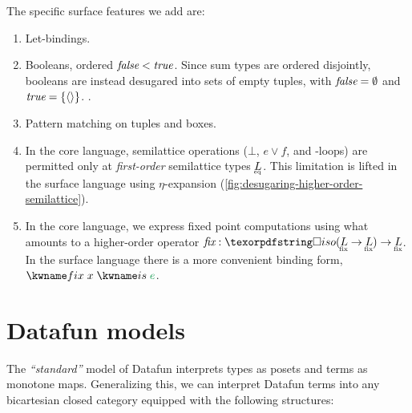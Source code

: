 \documentclass{rntz}\usepackage{fantasy}%
\begin{document}
The specific surface features we add are:
\begin{enumerate}
\item Let-bindings.

\item Booleans, ordered $\textmd{\itshape false} < \textmd{\itshape true}$. Since sum types are ordered
  disjointly, booleans are instead desugared into sets of empty tuples, with
  $\textmd{\itshape false} = \emptyset$ and $\textmd{\itshape true} = \{{\langle{}\rangle}\}$. .

\item Pattern matching on tuples and boxes. 

\item In the core language, semilattice operations ($\bot$, $e \vee f$, and
  -loops) are permitted only at \emph{first-order} semilattice types
  $\eqt L$. This limitation is lifted in the surface language using
  $\eta$-expansion (\cref{fig:desugaring-higher-order-semilattice}).

\item In the core language, we express fixed point computations using what
  amounts to a higher-order operator $\prim{fix} : \isof{(\fixt L \to \fixt L)}
  \to \fixt L$. In the surface language there is a more convenient binding form,
  $\efixisd x e$.

\end{enumerate}


\section{Datafun models}
\label{sec:datafun-models}

The \emph{``standard''} model of Datafun interprets types as posets and terms as
monotone maps. Generalizing this, we can interpret Datafun terms into any
bicartesian closed category \catC{} equipped with the following structures:
\end{document}
